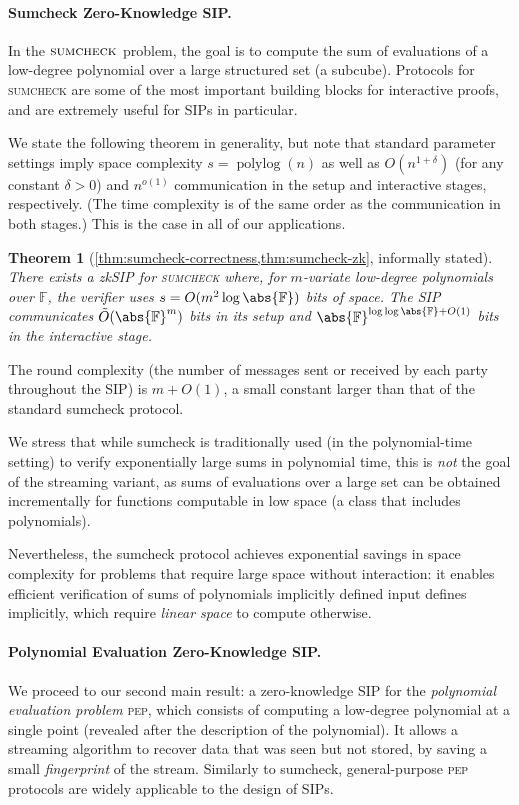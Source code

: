 \documentclass[a4paper,UKenglish,cleveref, autoref, thm-restate]{lipics-v2021}
\newtheorem{theorem}{Theorem}[section]
\theoremstyle{definition}
\newcommand{\zksip}{\textrm{zkSIP}}
\newcommand{\field}{\mathbb{F}}
\newcommand{\polylog}{\operatorname{polylog}}
\newcommand{\indexproblem}{\normalfont\textsc{index}\xspace}
\newcommand{\pep}{\normalfont\textsc{pep}\xspace}
\newcommand{\sumcheck}{\normalfont\textsc{sumcheck}\xspace}
\newcommand{\dimension}{m}
\begin{document}
\paragraph*{Sumcheck Zero-Knowledge SIP\iflipics\else.\fi}
In the $\sumcheck$ problem, the goal is to compute the sum of evaluations of a low-degree polynomial over a large structured set (a subcube). Protocols for \sumcheck are some of the most important building blocks for interactive proofs, and are extremely useful for SIPs in particular.

We state the following theorem in generality, but note that standard parameter settings imply space complexity $s = \polylog(n)$ as well as $O(n^{1 + \delta})$ (for any constant $\delta > 0$) and $n^{o(1)}$ communication in the setup and interactive stages, respectively. (The time complexity is of the same order as the communication in both stages.) This is the case in all of our applications.

\begin{theorem}[\cref{thm:sumcheck-correctness,thm:sumcheck-zk}, informally stated]
    \label{infthm:zk-sumcheck}
    There exists a \zksip{} for \sumcheck where, for $\dimension$-variate low-degree polynomials over $\field$, the verifier uses $s = O(\dimension^2 \log \abs{\field})$ bits of space. The SIP communicates $\tilde O(\abs{\field}^\dimension)$ bits in its setup and $\abs{\field}^{\log\log \abs{\field} + O(1)}$ bits in the interactive stage.
\end{theorem}

The round complexity (the number of messages sent or received by each party throughout the SIP) is $\dimension + O(1)$, a small constant larger than that of the standard sumcheck protocol.

We stress that while sumcheck is traditionally used (in the polynomial-time setting) to verify exponentially large sums in polynomial time, this is \emph{not} the goal of the streaming variant, as sums of evaluations over a large set can be obtained incrementally for functions computable in low space (a class that includes polynomials).

Nevertheless, the sumcheck protocol achieves exponential savings in space complexity for problems that require large space without interaction: it enables efficient verification of sums of polynomials implicitly defined  input defines implicitly, which require \emph{linear space} to compute otherwise.

\paragraph*{Polynomial Evaluation Zero-Knowledge SIP\iflipics\else.\fi}
We proceed to our second main result: a zero-knowledge SIP for the \emph{polynomial evaluation problem} \pep, which consists of computing a low-degree polynomial at a single point (revealed after the description of the polynomial). It allows a streaming algorithm to recover data that was seen but not stored, by saving a small \emph{fingerprint} of the stream.
Similarly to sumcheck, general-purpose \pep protocols are widely applicable to the design of SIPs.%
\end{document}
